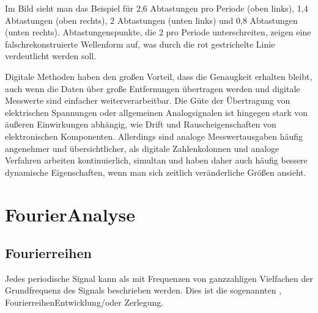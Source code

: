 \documentclass[letterpaper,10pt,english]{jupyterBook}
\begin{document}
\sphinxAtStartPar
Im Bild sieht man das Beispiel für 2,6 Abtastungen pro Periode (oben links), 1,4 Abtastungen (oben rechts), 2 Abtastungen (unten links) und 0,8 Abtastungen (unten rechts). Abtastungenspunkte, die 2 pro Periode unterschreiten, zeigen eine falsch\sphinxhyphen{}rekonstruierte Wellenform auf, was durch die rot gestrichelte Linie verdeutlicht werden soll.

\sphinxAtStartPar
{}

\sphinxAtStartPar
Digitale Methoden haben den großen Vorteil, dass die Genaugkeit erhalten bleibt, auch wenn die Daten über große Entfernungen übertragen werden und digitale Messwerte sind einfacher weiterverarbeitbar. Die Güte der Übertragung von elektrischen Spannungen oder allgemeinen Analogsignalen ist hingegen stark von äußeren Einwirkungen abhängig, wie Drift\sphinxhyphen{} und Rauscheigenschaften von elektronischen Komponenten. Allerdings sind analoge Messwertausgaben häufig angenehmer und übersichtlicher, als digitale Zahlenkolonnen und analoge Verfahren arbeiten kontinuierlich, simultan und haben daher auch häufig bessere dynamische Eigenschaften, wenn man sich zeitlich veränderliche Größen ansieht.

\sphinxstepscope


\section{Fourier\sphinxhyphen{}Analyse}
\label{\detokenize{content/3_FourierAnalyse:fourier-analyse}}\label{\detokenize{content/3_FourierAnalyse::doc}}

\subsection{Fourierreihen}
\label{\detokenize{content/3_FourierAnalyse:fourierreihen}}
\sphinxAtStartPar
Jedes periodische Signal kann als  mit Frequenzen von ganzzahligen Vielfachen der Grundfrequenz des Signals beschrieben werden. Dies ist die sogenannten , Fourierreihen\sphinxhyphen{}Entwicklung/oder \sphinxhyphen{}Zerlegung.
\end{document}

